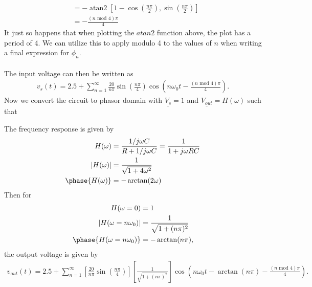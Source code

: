 \documentclass{report}
\begin{document}
\begin{solution}
\begin{align*}
        &= -\operatorname{atan2}\left[1-\cos\left(\frac{n\pi}{2}\right), \sin\left(\frac{n\pi}{2}\right)\right] \\
        &= -\frac{(n \text{ mod } 4)\pi}{4}
    \end{align*}
    It just so happens that when plotting the $atan2$ function above, the plot has a period of 4. We can utilize this to apply modulo 4 to the values of $n$ 
    when writing a final expression for $\phi_n$.
    \\ \\ 
    The input voltage can then be written as  
    \begin{align*}
        v_s(t) = 2.5 + \sum_{n=1}^{\infty} \frac{20}{n\pi}\sin\left(\frac{n\pi}{4}\right) \cos\left( n\omega_0 t -\frac{(n \text{ mod } 4)\pi}{4} \right).
    \end{align*}
    Now we convert the circuit to phasor domain with $\underline{V_s}=1$ and $\underline{V_{out}}=H(\omega)$ such that 
    \begin{center}
    \end{center}
    The frequency response is given by  
    \begin{align*}
        H(\omega) &= \frac{1/j\omega C}{R + 1/j\omega C} = \frac{1}{1+j\omega RC} \\
        |H(\omega)| &= \frac{1}{\sqrt{1+4\omega^2}} \\ 
        \phase{H(\omega)} &= -\arctan(2\omega)
    \end{align*}
    Then for 
    \begin{align*}
        H(\omega = 0) &= 1 \\
        |H(\omega = n\omega_0)| &= \frac{1}{\sqrt{1+(n\pi)^2}} \\
        \phase{H(\omega = n\omega_0)} &= -\arctan(n\pi),
    \end{align*}
    the output voltage is given by 
    \begin{align*}
        v_{out}(t) = 2.5 + \sum_{n=1}^{\infty} \left[\frac{20}{n\pi}\sin\left(\frac{n\pi}{4}\right)\right]\left[\frac{1}{\sqrt{1+(n\pi)^2}}\right] \cos\left( n\omega_0 t -\arctan(n\pi) -\frac{(n \text{ mod } 4)\pi}{4} \right).
    \end{align*}
\end{solution}
\end{document}
